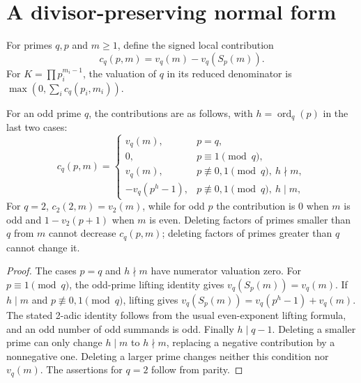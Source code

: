 \section{A divisor-preserving normal form}\label{sec:normal}
For primes $q,p$ and $m\ge1$, define the signed local contribution
\[
 c_q(p,m)=v_q(m)-v_q(S_p(m)).
\]
For $K=\prod p_i^{m_i-1}$, the valuation of $q$ in its reduced
denominator is $\max(0,\sum_i c_q(p_i,m_i))$.

\begin{lemma}\label{lem:triangular}
For an odd prime $q$, the contributions are as follows, with
$h=\operatorname{ord}_q(p)$ in the last two cases:
\begin{equation}\label{eq:local-contributions}
 c_q(p,m)=
 \begin{cases}
 v_q(m),&p=q,\\
 0,&p\equiv1\pmod q,\\
 v_q(m),&p\not\equiv0,1\pmod q,\ h\nmid m,\\
 -v_q(p^h-1),&p\not\equiv0,1\pmod q,\ h\mid m,
 \end{cases}
\end{equation}
For $q=2$, $c_2(2,m)=v_2(m)$, while for odd $p$ the contribution is
0 when $m$ is odd and $1-v_2(p+1)$ when $m$ is even.
Deleting factors of primes smaller than $q$ from $m$ cannot decrease
$c_q(p,m)$; deleting factors of primes greater than $q$ cannot change it.
\end{lemma}
\begin{proof}
The cases $p=q$ and $h\nmid m$ have numerator valuation zero.
For $p\equiv1\pmod q$, the odd-prime lifting identity gives
$v_q(S_p(m))=v_q(m)$. If $h\mid m$ and $p\not\equiv0,1\pmod q$,
lifting gives $v_q(S_p(m))=v_q(p^h-1)+v_q(m)$.
The stated 2-adic identity follows from the usual even-exponent
lifting formula, and an odd number of odd summands is odd.
Finally $h\mid q-1$. Deleting a smaller prime can only change
$h\mid m$ to $h\nmid m$, replacing a negative contribution by a
nonnegative one. Deleting a larger prime changes neither this condition
nor $v_q(m)$. The assertions for $q=2$ follow from parity.
\end{proof}

